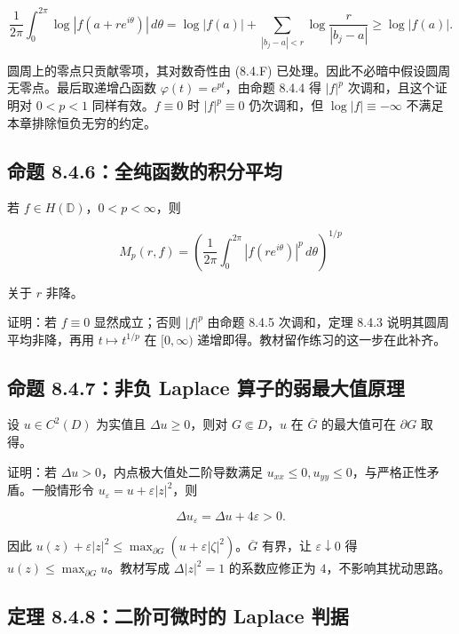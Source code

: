 \documentclass[11pt,a4paper]{article}
\begin{document}
\[
\frac1{2\pi}\int_0^{2\pi}\log|f(a+re^{i\theta})|\,d\theta
=\log|f(a)|+\sum_{|b_j-a|<r}\log\frac r{|b_j-a|}
\ge\log|f(a)|.\tag{8.4.3}
\]

圆周上的零点只贡献零项，其对数奇性由 (8.4.F)
已处理。因此不必暗中假设圆周无零点。最后取递增凸函数
\(\varphi(t)=e^{pt}\)，由命题 8.4.4 得 \(|f|^p\) 次调和，且这个证明对
\(0<p<1\) 同样有效。\(f\equiv0\) 时 \(|f|^p\equiv0\) 仍次调和，但
\(\log|f|\equiv-\infty\) 不满足本章排除恒负无穷的约定。

\subsection{命题 8.4.6：全纯函数的积分平均}\label{ch08-s4-heading-7}

若 \(f\in H(\mathbb D)\)，\(0<p<\infty\)，则

\[
M_p(r,f)=\left(\frac1{2\pi}\int_0^{2\pi}|f(re^{i\theta})|^p\,d\theta\right)^{1/p}
\]

关于 \(r\) 非降。

证明：若 \(f\equiv0\) 显然成立；否则 \(|f|^p\) 由命题 8.4.5 次调和，定理
8.4.3 说明其圆周平均非降，再用 \(t\mapsto t^{1/p}\) 在 \([0,\infty)\)
递增即得。教材留作练习的这一步在此补齐。

\subsection{命题 8.4.7：非负 Laplace
算子的弱最大值原理}\label{ch08-s4-heading-8}

设 \(u\in C^2(D)\) 为实值且 \(\Delta u\ge0\)，则对 \(G\Subset D\)，\(u\)
在 \(\overline G\) 的最大值可在 \(\partial G\) 取得。

证明：若 \(\Delta u>0\)，内点极大值处二阶导数满足
\(u_{xx}\le0,u_{yy}\le0\)，与严格正性矛盾。一般情形令
\(u_\varepsilon=u+\varepsilon|z|^2\)，则

\[
\Delta u_\varepsilon=\Delta u+4\varepsilon>0.\tag{8.4.G}
\]

因此
\(u(z)+\varepsilon|z|^2\le\max_{\partial G}(u+\varepsilon|\zeta|^2)\)。\(\overline G\)
有界，让 \(\varepsilon\downarrow0\) 得
\(u(z)\le\max_{\partial G}u\)。教材写成 \(\Delta|z|^2=1\) 的系数应修正为
\(4\)，不影响其扰动思路。

\subsection{定理 8.4.8：二阶可微时的 Laplace 判据}\label{ch08-s4-heading-9}
\end{document}
